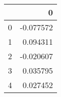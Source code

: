\begin{tabular}{lr}
\toprule
{} &         0 \\
\midrule
0 & -0.077572 \\
1 &  0.094311 \\
2 & -0.020607 \\
3 &  0.035795 \\
4 &  0.027452 \\
\bottomrule
\end{tabular}
